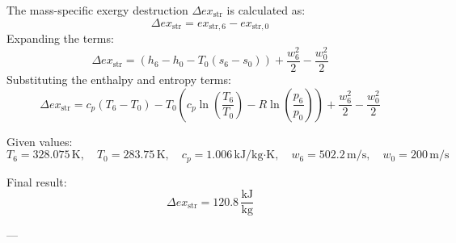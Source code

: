 The mass-specific exergy destruction \( \Delta ex_{\text{str}} \) is calculated as:  
\[
\Delta ex_{\text{str}} = ex_{\text{str},6} - ex_{\text{str},0}
\]  
Expanding the terms:  
\[
\Delta ex_{\text{str}} = (h_6 - h_0 - T_0 (s_6 - s_0)) + \frac{w_6^2}{2} - \frac{w_0^2}{2}
\]  
Substituting the enthalpy and entropy terms:  
\[
\Delta ex_{\text{str}} = c_p (T_6 - T_0) - T_0 \left( c_p \ln \left( \frac{T_6}{T_0} \right) - R \ln \left( \frac{p_6}{p_0} \right) \right) + \frac{w_6^2}{2} - \frac{w_0^2}{2}
\]  

Given values:  
\[
T_6 = 328.075 \, \text{K}, \quad T_0 = 283.75 \, \text{K}, \quad c_p = 1.006 \, \text{kJ/kg·K}, \quad w_6 = 502.2 \, \text{m/s}, \quad w_0 = 200 \, \text{m/s}
\]  

Final result:  
\[
\Delta ex_{\text{str}} = 120.8 \, \frac{\text{kJ}}{\text{kg}}
\]  

---